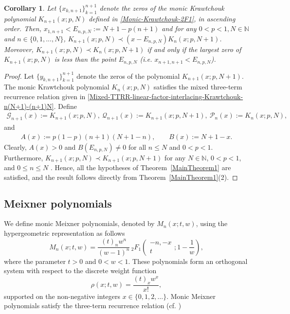 \documentclass[final,3p,times,12pt]{elsarticle}
\newtheorem{corollary}{Corollary}[section]
\numberwithin{equation}{section}  %
\begin{document}
\begin{corollary}
	Let $\{x_{k,n+1}\}_{k=1}^{n+1}$ denote the zeros of the monic Krawtchouk polynomial $K_{n+1}(x; p, N)$ defined in \eqref{Monic-Krawtchouk-2F1}, in ascending order.  Then, $x_{1,n+1}<E_{n,p,N}:= N+1-p(n+1)$ and for any $0<p<1, N\in \mathbb{N}$ and $n\in \{0,1,...,N\}$, $K_{n+1}(x; p, N)\prec (x-E_{n,p,N})K_n(x; p, N+1)$. Moreover, $K_{n+1}(x; p, N)\prec K_n(x; p, N+1)$ if and only if the largest zero of $K_{n+1}(x; p, N)$ is less than the point $E_{n,p,N}$ (i.e. $x_{n+1,n+1}<E_{n,p,N}$).
\end{corollary} 
\begin{proof}
	Let $\{y_{k,n+1}\}_{k=1}^{n+1}$ denote the zeros of the polynomial 
	$K_{n+1}(x; p, N+1)$. 
	The monic Krawtchouk polynomial $K_n(x; p, N)$ satisfies the mixed three-term recurrence 
	relation given in \eqref{Mixed-TTRR-linear-factor-interlacing-Krawtchouk-n(N+1)-(n+1)N}.	Define
	\begin{align}
		\mathcal{G}_{n+1}(x):=K_{n+1}(x; p, N), ~
		\mathcal{Q}_{n+1}(x):=K_{n+1}(x; p, N+1), ~
		\mathcal{P}_n(x):=K_n(x; p, N),
	\end{align}and 
	\begin{align}
		A(x):=p(1-p)(n+1)(N+1-n), \qquad 
		B(x):=N+1-x.
	\end{align}
	Clearly, $A(x)>0$ and $B(E_{n,p,N})\neq 0$ for all $ n \le N$ and $0<p<1$.
	Furthermore, $K_{n+1}(x; p, N)\prec K_{n+1}(x; p, N+1)$ for any $N\in\mathbb{N}$, $0<p<1$, and $0\le n \le N$ \cite[Theorem 4.1]{Jordaan-Tookos-ANM-2009}.
	Hence, all the hypotheses of Theorem~\ref{MainTheorem1} are satisfied, 
	and the result follows directly from Theorem~\ref{MainTheorem1}(2).
\end{proof}

\subsection{Meixner polynomials} \label{Examples Meixner} We define monic Meixner polynomials, denoted by $M_n(x; t, w)$, using the hypergeometric representation as follows
\begin{equation}
	M_n(x; t, w) = \frac{(t)_n w^n}{(w-1)^n} \, {}_2F_1\left(\begin{matrix} -n, -x \\ t \end{matrix} ; 1 - \frac{1}{w}\right),
\end{equation}
where the parameter $t > 0$ and $0<w<1$. These polynomials form an orthogonal system with respect to the discrete weight function 
\begin{equation}\label{Meixner-Weight}
	\rho(x; t, w) = \frac{(t)_x w^x}{x!},
\end{equation} supported on the non-negative integers $x \in \{0, 1, 2, \dots\}$. Monic Meixner polynomials satisfy the three-term recurrence relation (cf. \cite[page 234]{Koekoek-Book-HypergeometricOP})
\end{document}
